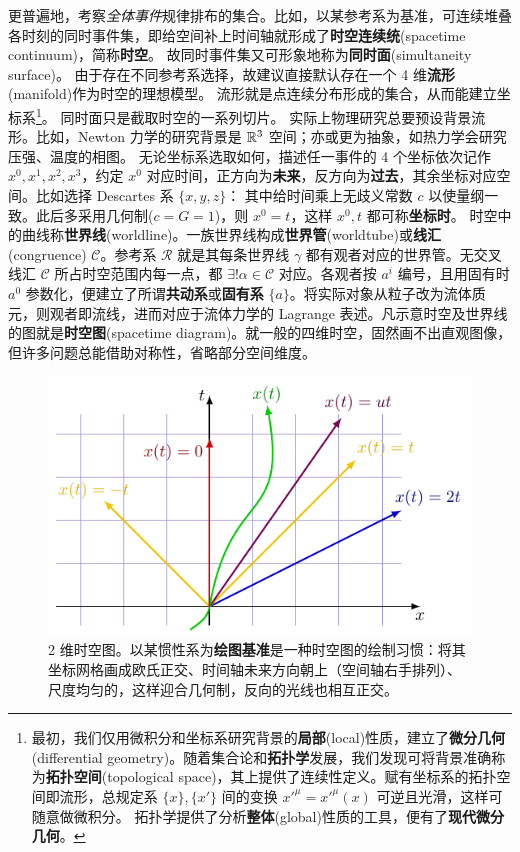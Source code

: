 更普遍地，考察\textit{全体事件}规律排布的集合。比如，以某参考系为基准，可连续堆叠各时刻的同时事件集，即给空间补上时间轴就形成了\textbf{时空连续统}(spacetime continuum)，简称\textbf{时空}。
故同时事件集又可形象地称为\textbf{同时面}(simultaneity surface)。
由于存在不同参考系选择，故建议直接默认存在一个 4 维\textbf{流形}(manifold)作为时空的理想模型。
流形就是点连续分布形成的集合，从而能建立坐标系\footnote{最初，我们仅用微积分和坐标系研究背景的\textbf{局部}(local)性质，建立了\textbf{微分几何}(differential geometry)。随着集合论和\textbf{拓扑学}发展，我们发现可将背景准确称为\textbf{拓扑空间}(topological space)，其上提供了连续性定义。赋有坐标系的拓扑空间即流形，总规定系 $\{x\},\{x'\}$ 间的变换 $x'^\mu=x'^\mu(x)$ 可逆且光滑，这样可随意做微积分。
拓扑学提供了分析\textbf{整体}(global)性质的工具，便有了\textbf{现代微分几何}。}。
同时面只是截取时空的一系列切片。
实际上物理研究总要预设背景流形。比如，Newton 力学的研究背景是 $\mathbb{R}^3$ 空间；亦或更为抽象，如热力学会研究压强、温度的相图。
无论坐标系选取如何，描述任一事件的 4 个坐标依次记作 $x^0,x^1,x^2,x^3$，约定 $x^0$ 对应时间，正方向为\textbf{未来}，反方向为\textbf{过去}，其余坐标对应空间。比如选择 Descartes 系 $\{x,y,z\}$：
其中给时间乘上无歧义常数 $c$ 以使量纲一致。此后多采用几何制($c=G=1$)，则 $x^0=t$，这样 $x^0,t$ 都可称\textbf{坐标时}。
时空中的曲线称\textbf{世界线}(worldline)。一族世界线构成\textbf{世界管}(worldtube)或\textbf{线汇}(congruence) $\mathscr C$。参考系 $\mathscr R$ 就是其每条世界线 $\gamma$ 都有观者对应的世界管。无交叉线汇 $\mathscr C$ 所占时空范围内每一点，都 $\exists! \alpha\in\mathscr C$ 对应。各观者按 $a^i$ 编号，且用固有时 $a^0$ 参数化，便建立了所谓\textbf{共动系}或\textbf{固有系} $\{a\}$。将实际对象从粒子改为流体质元，则观者即流线，进而对应于流体力学的 Lagrange 表述。凡示意时空及世界线的图就是\textbf{时空图}(spacetime diagram)。就一般的四维时空，固然画不出直观图像，但许多问题总能借助对称性，省略部分空间维度。

\begin{figure}
    \centering
    \includegraphics[width=.5\textwidth]{fig/chpt01/worldlines.pdf}
    \caption{\small 2 维时空图。以某惯性系为\textbf{绘图基准}是一种时空图的绘制习惯：将其坐标网格画成欧氏正交、时间轴未来方向朝上（空间轴右手排列）、尺度均匀的，这样迎合几何制，反向的光线也相互正交。}
\end{figure}


